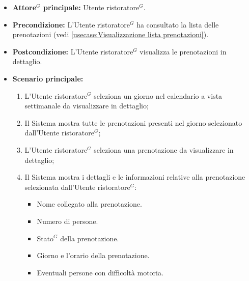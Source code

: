 \label{usecase:Visualizza dettaglio lista prenotazioni}
\begin{itemize}
	\item \textbf{\gls{Attore}$^G$ principale:} \gls{Utente ristoratore}$^G$.

	\item \textbf{Precondizione:} L'\gls{Utente ristoratore}$^G$ ha consultato la lista delle prenotazioni (vedi \autoref{usecase:Visualizzazione lista prenotazioni}).

	\item \textbf{Postcondizione:} L'\gls{Utente ristoratore}$^G$ visualizza le prenotazioni in dettaglio.


	\item \textbf{Scenario principale:}
	      \begin{enumerate}
		      \item L'\gls{Utente ristoratore}$^G$ seleziona un giorno nel calendario a vista settimanale da visualizzare in dettaglio;
		      \item Il Sistema mostra tutte le prenotazioni presenti nel giorno selezionato dall'\gls{Utente ristoratore}$^G$;

		      \item L'\gls{Utente ristoratore}$^G$ seleziona una prenotazione da visualizzare in dettaglio;
		      \item Il Sistema mostra i dettagli e le informazioni relative alla prenotazione selezionata dall'\gls{Utente ristoratore}$^G$:
		            \begin{itemize}
			            \item Nome collegato alla prenotazione.
			            \item Numero di persone.
			            \item \gls{Stato}$^G$ della prenotazione.
			            \item Giorno e l'orario della prenotazione.
			            \item Eventuali persone con difficoltà motoria.
		            \end{itemize}

	      \end{enumerate}
\end{itemize}
